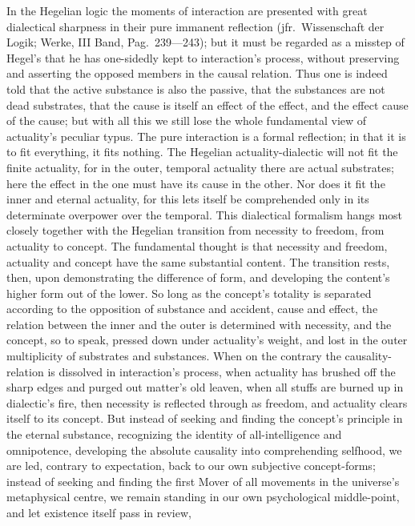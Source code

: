 \documentclass[12pt]{book}
\begin{document}
In the Hegelian logic the moments of interaction are presented with great
dialectical sharpness in their pure immanent reflection (jfr.\ Wissenschaft
der Logik; Werke, III Band, Pag.\ 239---243); but it must be regarded as a
misstep of Hegel's that he has one-sidedly kept to interaction's process,
without preserving and asserting the opposed members in the causal relation.
Thus one is indeed told that the active substance is also the passive, that
the substances are not dead substrates, that the cause is itself an effect
of the effect, and the effect cause of the cause; but with all this we still
lose the whole fundamental view of actuality's peculiar typus. The pure
interaction is a formal reflection; in that it is to fit everything, it fits
nothing. The Hegelian actuality-dialectic will not fit the finite actuality,
for in the outer, temporal actuality there are actual substrates; here the
effect in the one must have its cause in the other. Nor does it fit the
inner and eternal actuality, for this lets itself be comprehended only in
its determinate overpower over the temporal. This dialectical formalism
hangs most closely together with the Hegelian transition from necessity to
freedom, from actuality to concept. The fundamental thought is that
necessity and freedom, actuality and concept have the same substantial
content. The transition rests, then, upon demonstrating the difference of
form, and developing the content's higher form out of the lower. So long as
the concept's totality is separated according to the opposition of substance
and accident, cause and effect, the relation between the inner and the outer
is determined with necessity, and the concept, so to speak, pressed down
under actuality's weight, and lost in the outer multiplicity of substrates
and substances. When on the contrary the causality-relation is dissolved in
interaction's process, when actuality has brushed off the sharp edges and
purged out matter's old leaven, when all stuffs are burned up in dialectic's
fire, then necessity is reflected through as freedom, and actuality clears
itself to its concept. But instead of seeking and finding the concept's
principle in the eternal substance, recognizing the identity of
all-intelligence and omnipotence, developing the absolute causality into
comprehending selfhood, we are led, contrary to expectation, back to our own
subjective concept-forms; instead of seeking and finding the first Mover of
all movements in the universe's metaphysical centre, we remain standing in
our own psychological middle-point, and let existence itself pass in review,
\end{document}
